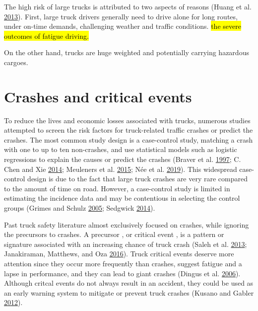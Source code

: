 \documentclass[12pt]{book}
\numberwithin{equation}{chapter}
\begin{document}
The high risk of large trucks is attributed to two aspects of reasons (Huang et al. \protect\hyperlink{ref-huang2013development}{2013}). First, large truck drivers generally need to drive alone for long routes, under on-time demands, challenging weather and traffic conditions. \hl{the severe outcomes of fatigue driving.}

On the other hand, trucks are huge weighted and potentially carrying hazardous cargoes.

\hypertarget{crashes-and-critical-events}{%
\section{Crashes and critical events}\label{crashes-and-critical-events}}

To reduce the lives and economic losses associated with trucks, numerous studies attempted to screen the risk factors for truck-related traffic crashes or predict the crashes. The most common study design is a case-control study, matching a crash with one to up to ten non-crashes, and use statistical models such as logistic regressions to explain the causes or predict the crashes (Braver et al. \protect\hyperlink{ref-braver1997tractor}{1997}; C. Chen and Xie \protect\hyperlink{ref-chen2014modeling}{2014}; Meuleners et al. \protect\hyperlink{ref-meuleners2015obstructive}{2015}; Née et al. \protect\hyperlink{ref-nee2019road}{2019}). This widespread case-control design is due to the fact that large truck crashes are very rare compared to the amount of time on road. However, a case-control study is limited in estimating the incidence data and may be contentious in selecting the control groups (Grimes and Schulz \protect\hyperlink{ref-grimes2005compared}{2005}; Sedgwick \protect\hyperlink{ref-sedgwick2014case}{2014}).

Past truck safety literature almost exclusively focused on crashes, while ignoring the precursors to crashes. A precursor , or critical event , is a pattern or signature associated with an increasing chance of truck crash (Saleh et al. \protect\hyperlink{ref-saleh2013accident}{2013}; Janakiraman, Matthews, and Oza \protect\hyperlink{ref-janakiraman2016discovery}{2016}). Truck critical events deserve more attention since they occur more frequently than crashes, suggest fatigue and a lapse in performance, and they can lead to giant crashes (Dingus et al. \protect\hyperlink{ref-dingus2006development}{2006}). Although critcal events do not always result in an accident, they could be used as an early warning system to mitigate or prevent truck crashes (Kusano and Gabler \protect\hyperlink{ref-kusano2012safety}{2012}).
\end{document}
